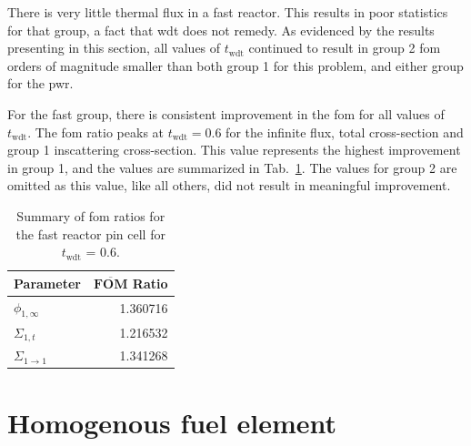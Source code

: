 There is very little thermal flux in a fast reactor. This results in
poor statistics for that group, a fact that \gls{wdt} does not
remedy. As evidenced by the results presenting in this section, all
values of $t_{\mathrm{wdt}}$ continued to result in group 2 \gls{fom} orders
of magnitude smaller than both group 1 for this problem, and either
group for the \gls{pwr}.

For the fast group, there is consistent improvement in the \gls{fom}
for all values of $t_{\mathrm{wdt}}$. The \gls{fom} ratio peaks at
$t_{\mathrm{wdt}} = 0.6$ for the infinite flux, total cross-section
and group 1 inscattering cross-section. This value represents the
highest improvement in group 1, and the values are summarized in
Tab.~\ref{tab:fast_discussion}. The values for group 2 are omitted as
this value, like all others, did not result in meaningful improvement.

\begin{table}[hbtp]
  \centering
  \caption{Summary of \acrshort{fom} ratios for the fast reactor pin
  cell for $t_{\mathrm{wdt}}$ = 0.6.}
  \begin{tabular}{lr}\toprule
    \textbf{Parameter}& $\overline{\mathbf{FOM}}$ \textbf{Ratio} \\ \midrule
    $\phi_{1, \infty}$ & 1.360716 \\
    $\Sigma_{1,t}$ & 1.216532 \\
    $\Sigma_{1 \to 1}$ & 1.341268 \\ \bottomrule
  \end{tabular}
  \label{tab:fast_discussion}
\end{table}


\newpage
\section{Homogenous fuel element}
\label{sec:homog}

